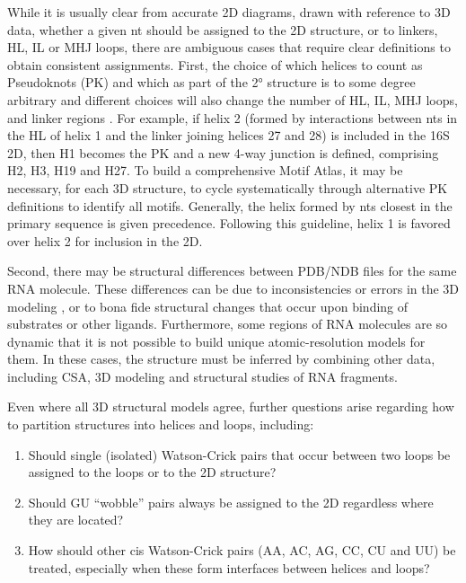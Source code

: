 While it is usually clear from accurate 2D diagrams, drawn with reference to 3D
data, whether a given nt should be assigned to the 2D structure, or to linkers,
HL, IL or MHJ loops, there are ambiguous cases that require clear definitions to
obtain consistent assignments. First, the choice of which helices to count as
Pseudoknots (PK) and which as part of the 2° structure is to some degree
arbitrary and different choices will also change the number of HL, IL, MHJ
loops, and linker regions \cite{Smit2008}. For example, if helix 2 (formed by
interactions between nts in the HL of helix 1 and the linker joining helices 27
and 28) is included in the 16S 2D, then H1 becomes the PK and a new 4-way
junction is defined, comprising H2, H3, H19 and H27. To build a comprehensive
Motif Atlas, it may be necessary, for each 3D structure, to cycle systematically
through alternative PK definitions to identify all motifs. Generally, the helix
formed by nts closest in the primary sequence is given precedence. Following
this guideline, helix 1 is favored over helix 2 for inclusion in the 2D. 

Second, there may be structural differences between PDB/NDB files for the same
RNA molecule. These differences can be due to inconsistencies or errors in the
3D modeling \cite{Stombaugh2009}, or to bona fide structural changes that occur
upon binding of substrates or other ligands. Furthermore, some regions of RNA
molecules are so dynamic that it is not possible to build unique
atomic-resolution models for them. In these cases, the structure must be
inferred by combining other data, including CSA, 3D modeling and structural
studies of RNA fragments. 

Even where all 3D structural models agree, further questions arise regarding how
to partition structures into helices and loops, including:

\begin{enumerate}
  \item Should single (isolated) Watson-Crick pairs that occur between two loops
    be assigned to the loops or to the 2D structure? 

  \item Should GU ``wobble'' pairs always be assigned to the 2D regardless where
    they are located? 

  \item How should other cis Watson-Crick pairs (AA, AC, AG, CC, CU and UU) be
    treated, especially when these form interfaces between helices and loops? 
\end{enumerate}

